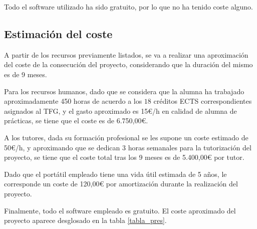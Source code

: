 Todo el software utilizado ha sido gratuito, por lo que no ha tenido coste alguno.

\subsection{Estimación del coste}

A partir de los recursos previamente listados, se va a realizar una aproximación del coste de la consecución del proyecto, considerando que la duración del mismo es de 9 meses.

Para los recursos humanos, dado que se considera que la alumna ha trabajado aproximadamente 450 horas de acuerdo a los $18$ créditos ECTS correspondientes asignados al TFG, y el gasto aproximado es 15€/h en calidad de alumna de prácticas, se tiene que el coste es de 6.750,00€.

A los tutores, dada su formación profesional se les supone un coste estimado de 50€/h, y aproximando que se dedican 3 horas semanales para la tutorización del proyecto, se tiene que el coste total tras los 9 meses es de 5.400,00€ por tutor.

Dado que el portátil empleado tiene una vida útil estimada de 5 años, le corresponde un coste de 120,00€ por amortización durante la realización del proyecto.

Finalmente, todo el software empleado es gratuito. El coste aproximado del proyecto aparece desglosado en la tabla \ref{tabla_pres}.

